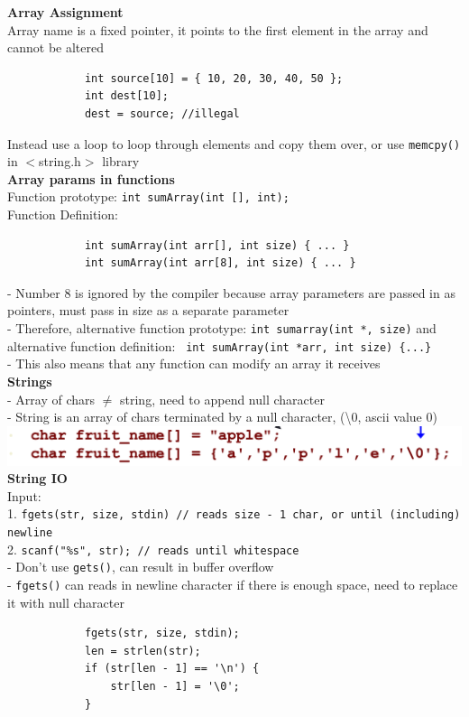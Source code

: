 \documentclass[10pt, a4paper]{article}
\begin{document}
\begin{multicols*}{3}
		\textbf{Array Assignment}\\
		Array name is a fixed pointer, it points to the first element in the array and cannot be altered
		\begin{verbatim}
			int source[10] = { 10, 20, 30, 40, 50 };
			int dest[10];
			dest = source; //illegal
		\end{verbatim}
		Instead use a loop to loop through elements and copy them over, or use \texttt{memcpy()} in $<$string.h$>$ library\\
		
		\textbf{Array params in functions}\\
		Function prototype: \texttt{int sumArray(int [], int);}\\
		Function Definition: 
		\begin{verbatim}
			int sumArray(int arr[], int size) { ... }
			int sumArray(int arr[8], int size) { ... }
		\end{verbatim}
		- Number 8 is ignored by the compiler because array parameters are passed in as pointers, must pass in size as a separate parameter\\
		- Therefore, alternative function prototype: \texttt{int sumarray(int *, size)} and alternative function definition: \texttt{ int sumArray(int *arr, int size) \{...\} }\\
		- This also means that any function can modify an array it receives\\
		
		\textbf{Strings}\\
		- Array of chars $\neq$ string, need to append null character\\
		- String is an array of chars terminated by a null character, (\textbackslash 0, ascii value 0)\\
		\includegraphics[scale=0.25]{./assets/stringInitialise}\\
		
		\textbf{String IO}\\
		Input:\\
		1. \texttt{fgets(str, size, stdin) // reads size - 1 char, or until (including) newline}\\
		2. \texttt{scanf("\%s", str); // reads until whitespace}\\  
		- Don't use \texttt{gets()}, can result in buffer overflow\\
		- \texttt{fgets()} can reads in newline character if there is enough space, need to replace it with null character
		\begin{verbatim}
			fgets(str, size, stdin);
			len = strlen(str);
			if (str[len - 1] == '\n') {
			    str[len - 1] = '\0';
			}
		\end{verbatim}
			

\end{multicols*}
\end{document}
